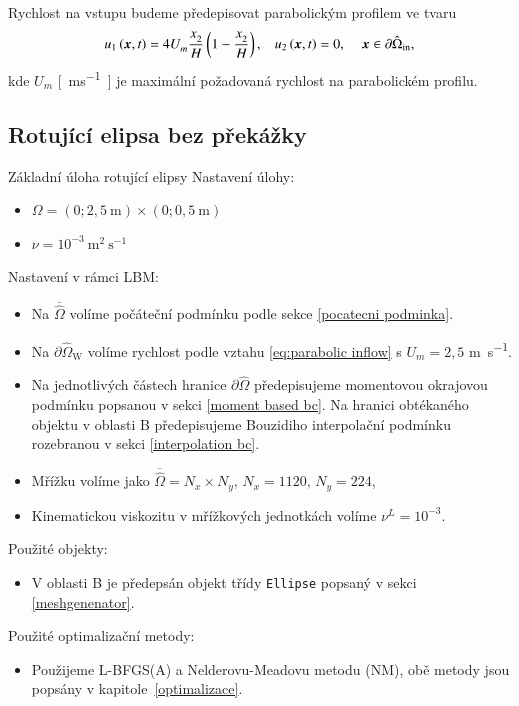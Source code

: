 Rychlost na vstupu budeme předepisovat parabolickým profilem ve tvaru
\begin{equation}\label{eq:parabolic inflow}
u_{1} \left(\vec{x}, t\right) = 4 U^{}_{m} \frac{x^{}_{2}}{H} \left(1 - \frac{x^{}_{2}}{H}\right), \hspace{3mm} u_{2} \left(\vec{x}, t\right) = 0, \hspace{4mm} \vec{x} \in \partial \hat{\Omega}_{\mathrm{in}},
\end{equation}
kde $ U^{}_{m}$ \si{[ms^{-1}]} je maximální požadovaná rychlost na parabolickém profilu.


\subsection{Rotující elipsa bez překážky}
\begin{uloha}{Základní úloha rotující elipsy}
	\vspace{2mm}
	Nastavení úlohy:
	\begin{itemize}
		\item $ \Omega=(0 ; 2{,}5 \mathrm{~m}) \times(0 ; 0{,}5 \mathrm{~m})$
		\item $ \nu=10^{-3} \mathrm{~m}^{2} \mathrm{~s}^{-1}$
	\end{itemize} 
	Nastavení v rámci LBM:
	\begin{itemize}
		\item Na $ \overline{\hat{\Omega}} $ volíme počáteční podmínku podle sekce \ref{pocatecni podminka}.
		\item Na $ \partial \hat{\Omega}_{\mathrm{W}} $ volíme rychlost podle vztahu \eqref{eq:parabolic inflow} s $ U_m = 2{,}5 $ \si{m s^{-1}}.
		\item Na jednotlivých částech hranice $ \partial \hat{\Omega}$ předepisujeme momentovou okrajovou podmínku popsanou v sekci \ref{moment based bc}. Na hranici obtékaného objektu v oblasti B předepisujeme Bouzidiho interpolační podmínku rozebranou v sekci \ref{interpolation bc}.
		\item Mřížku volíme jako $\overline{\hat{\Omega}} = N_{x} \times N_{y}$, $N_{x} = 1120, \, N_{y} = 224$,
		\item Kinematickou viskozitu v mřížkových jednotkách volíme $\nu^{L} = 10^{-3} $.
	\end{itemize}
	Použité objekty:
	\begin{itemize}
		\item V oblasti B je předepsán objekt třídy \texttt{Ellipse} popsaný v sekci \ref{meshgenenator}.
	\end{itemize} 
	Použité optimalizační metody:
	\begin{itemize}
		\item Použijeme L-BFGS(A) a Nelderovu-Meadovu metodu (NM), obě metody jsou popsány v kapitole~\ref{optimalizace}.
	\end{itemize}
	\label{ulo:1}
\end{uloha}

